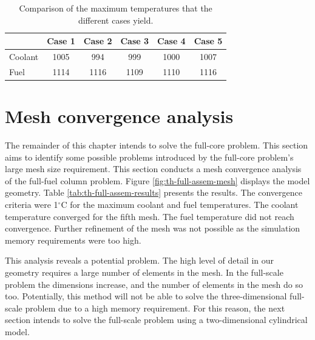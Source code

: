 \begin{table}[htbp!]
  \centering
  \caption{Comparison of the maximum temperatures that the different cases yield.}
  \label{tab:th-assem-flow-results}
\begin{tabular}{l|ccccc}
\toprule
        & Case 1 & Case 2 & Case 3 & Case 4 & Case 5 \\
\midrule
Coolant & 1005   &  994   &  999 & 1000 & 1007 \\
Fuel    & 1114   & 1116   & 1109 & 1110 & 1116 \\
\bottomrule
\end{tabular}
\end{table}

\section{Mesh convergence analysis}
\label{sec:meshconverge}

The remainder of this chapter intends to solve the full-core problem.
This section aims to identify some possible
problems introduced by the full-core problem's large mesh size requirement.
This section conducts a mesh convergence analysis of the full-fuel column problem.
Figure \ref{fig:th-full-assem-mesh} displays the model geometry.
Table \ref{tab:th-full-assem-results} presents the results.
The convergence criteria were 1$^{\circ}$C for the maximum coolant and fuel temperatures.
The coolant temperature converged for the fifth mesh.
The fuel temperature did not reach convergence.
Further refinement of the mesh was not possible as the simulation memory requirements were too high.

This analysis reveals a potential problem.
The high level of detail in our geometry requires a large number of elements in the mesh.
In the full-scale problem the dimensions increase, and the number of elements in the mesh do so too.
Potentially, this method will not be able to solve the three-dimensional full-scale problem due to a high memory requirement.
For this reason, the next section intends to solve the full-scale problem using a two-dimensional cylindrical model.


